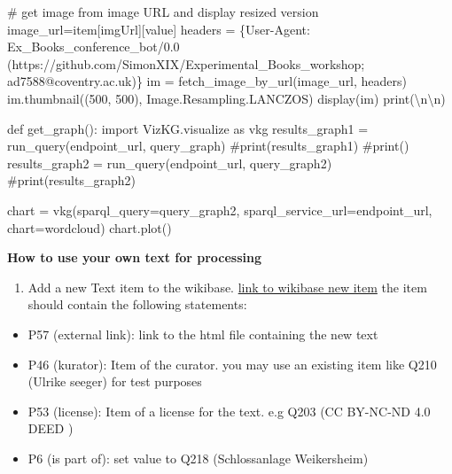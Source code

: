 \documentclass[
  a4paper,
]{book}
\newenvironment{Shaded}{\begin{snugshade}}{\end{snugshade}}
\newcommand{\BuiltInTok}[1]{\textcolor[rgb]{0.00,0.23,0.31}{#1}}
\newcommand{\CharTok}[1]{\textcolor[rgb]{0.13,0.47,0.30}{#1}}
\newcommand{\CommentTok}[1]{\textcolor[rgb]{0.37,0.37,0.37}{#1}}
\newcommand{\DecValTok}[1]{\textcolor[rgb]{0.68,0.00,0.00}{#1}}
\newcommand{\ImportTok}[1]{\textcolor[rgb]{0.00,0.46,0.62}{#1}}
\newcommand{\KeywordTok}[1]{\textcolor[rgb]{0.00,0.23,0.31}{#1}}
\newcommand{\NormalTok}[1]{\textcolor[rgb]{0.00,0.23,0.31}{#1}}
\newcommand{\OperatorTok}[1]{\textcolor[rgb]{0.37,0.37,0.37}{#1}}
\newcommand{\StringTok}[1]{\textcolor[rgb]{0.13,0.47,0.30}{#1}}
\providecommand{\tightlist}{%
  \setlength{\itemsep}{0pt}\setlength{\parskip}{0pt}}\usepackage{longtable,booktabs,array}
\begin{document}
\begin{Shaded}
\begin{Highlighting}[]
      \CommentTok{\# get image from image URL and display resized version}
\NormalTok{      image\_url}\OperatorTok{=}\NormalTok{item[}\StringTok{\textquotesingle{}imgUrl\textquotesingle{}}\NormalTok{][}\StringTok{\textquotesingle{}value\textquotesingle{}}\NormalTok{]}
\NormalTok{      headers }\OperatorTok{=}\NormalTok{ \{}\StringTok{\textquotesingle{}User{-}Agent\textquotesingle{}}\NormalTok{: }\StringTok{\textquotesingle{}Ex\_Books\_conference\_bot/0.0 (https://github.com/SimonXIX/Experimental\_Books\_workshop; ad7588@coventry.ac.uk)\textquotesingle{}}\NormalTok{\}}
\NormalTok{      im }\OperatorTok{=}\NormalTok{ fetch\_image\_by\_url(image\_url, headers)}
\NormalTok{      im.thumbnail((}\DecValTok{500}\NormalTok{, }\DecValTok{500}\NormalTok{), Image.Resampling.LANCZOS)}
\NormalTok{      display(im)}
      \BuiltInTok{print}\NormalTok{(}\StringTok{\textquotesingle{}}\CharTok{\textbackslash{}n\textbackslash{}n}\StringTok{\textquotesingle{}}\NormalTok{)}

\KeywordTok{def}\NormalTok{ get\_graph():}
    \ImportTok{import}\NormalTok{ VizKG.visualize }\ImportTok{as}\NormalTok{ vkg}
\NormalTok{    results\_graph1 }\OperatorTok{=}\NormalTok{ run\_query(endpoint\_url, query\_graph)}
    \CommentTok{\#print(results\_graph1)}
    \CommentTok{\#print(\textquotesingle{}{-}{-}{-}\textquotesingle{})}
\NormalTok{    results\_graph2 }\OperatorTok{=}\NormalTok{ run\_query(endpoint\_url, query\_graph2)}
    \CommentTok{\#print(results\_graph2)}

\NormalTok{    chart }\OperatorTok{=}\NormalTok{ vkg(sparql\_query}\OperatorTok{=}\NormalTok{query\_graph2, sparql\_service\_url}\OperatorTok{=}\NormalTok{endpoint\_url, chart}\OperatorTok{=}\StringTok{\textquotesingle{}wordcloud\textquotesingle{}}\NormalTok{)}
\NormalTok{    chart.plot()}
\end{Highlighting}
\end{Shaded}

\textbf{How to use your own text for processing}

\begin{enumerate}
\def\labelenumi{\arabic{enumi}.}
\tightlist
\item
  Add a new Text item to the wikibase.
  \href{https://computational-publishing-service.wikibase.cloud/wiki/Special:NewItem}{link
  to wikibase new item} the item should contain the following
  statements:
\end{enumerate}

\begin{itemize}
\tightlist
\item
  P57 (external link): link to the html file containing the new text
\item
  P46 (kurator): Item of the curator. you may use an existing item like
  Q210 (Ulrike seeger) for test purposes
\item
  P53 (license): Item of a license for the text. e.g Q203 (CC BY-NC-ND
  4.0 DEED )
\item
  P6 (is part of): set value to Q218 (Schlossanlage Weikersheim)
\end{itemize}
\end{document}
